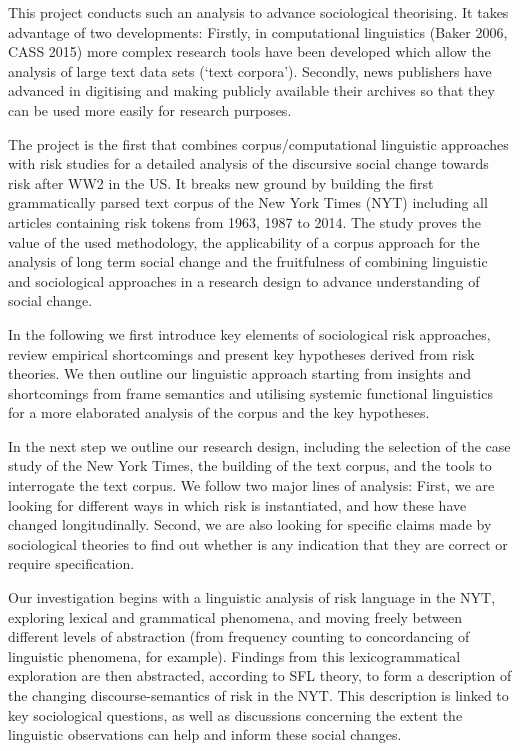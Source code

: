 This project conducts such an analysis to advance sociological theorising. It takes advantage of two developments: Firstly, in computational linguistics (Baker 2006, CASS 2015) more complex research tools have been developed which allow the analysis of large text data sets (`text corpora'). Secondly, news publishers have advanced in digitising and making publicly available their archives so that they can be used more easily for research purposes. 

The project is the first that combines corpus/computational linguistic approaches with risk studies for a detailed analysis of the discursive social change towards risk after WW2 in the US. It breaks new ground by building the first grammatically parsed text corpus of the New York Times (NYT) including all articles containing risk tokens from 1963, 1987 to 2014. The study proves the value of the used methodology, the applicability of a corpus approach for the analysis of long term social change and the fruitfulness of combining linguistic and sociological approaches in a research design to advance understanding of social change. 


In the following we first introduce key elements of sociological risk approaches, review empirical shortcomings and present key hypotheses derived from risk theories. We then outline our linguistic approach starting from insights and shortcomings from frame semantics and utilising systemic functional linguistics for a more elaborated analysis of the corpus and the key hypotheses.

In the next step we outline our research design, including the selection of the case study of the New York Times, the building of the text corpus, and the tools to interrogate the text corpus. We follow two major lines of analysis: First, we are looking for different ways in which risk is instantiated, and how these have changed longitudinally. Second, we are also looking for specific claims made by sociological theories to find out whether is any indication that they are correct or require specification. 

Our investigation begins with a linguistic analysis of risk language in the NYT, exploring lexical and grammatical phenomena, and moving freely between different levels of abstraction (from frequency counting to concordancing of linguistic phenomena, for example). Findings from this lexicogrammatical exploration are then abstracted, according to SFL theory, to form a description of the changing discourse-semantics of risk in the NYT. This description is linked to key sociological questions, as well as discussions concerning the extent the linguistic observations can help and inform these social changes. 

